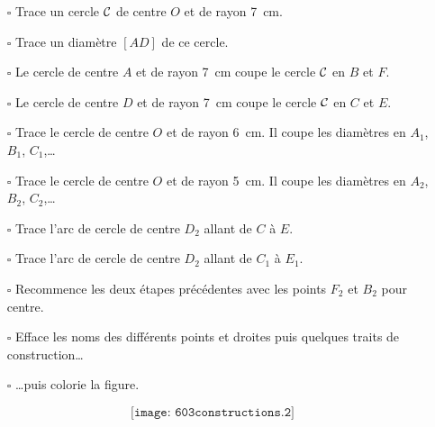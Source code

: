 \begin{cursive}
\begin{itemize}
\item[$\square$] Trace un cercle $\cal C$ de centre $O$ et de rayon
  7~cm.
\item[$\square$] Trace un diamètre $[AD]$ de ce cercle.
\item[$\square$] Le cercle de centre $A$ et de rayon 7~cm coupe le
  cercle $\cal C$ en $B$ et $F$.
\item[$\square$] Le cercle de centre $D$ et de rayon 7~cm coupe le
  cercle $\cal C$ en $C$ et $E$.
\item[$\square$] Trace le cercle de centre $O$ et de  rayon 6~cm. Il
  coupe les diamètres en $A_1$, $B_1$, $C_1$,\ldots
\item[$\square$] Trace le cercle de centre $O$ et de  rayon 5~cm. Il
  coupe les diamètres en $A_2$, $B_2$, $C_2$,\ldots
\item[$\square$] Trace l'arc de cercle de centre $D_2$ allant de $C$ à
  $E$.
\item[$\square$] Trace l'arc de cercle de centre $D_2$ allant de $C_1$
  à $E_1$.
\item[$\square$] Recommence les deux étapes précédentes avec les
  points $F_2$ et $B_2$ pour centre.
\item[$\square$] Efface les noms des différents points et droites puis
  quelques traits de construction\ldots
\item[$\square$] \ldots puis colorie la figure.
\end{itemize}
\end{cursive}
\[\texttt{[image: 603constructions.2]}\]
